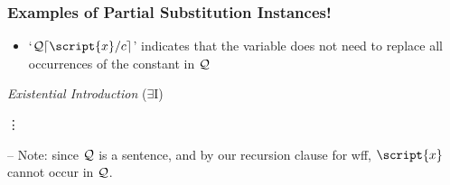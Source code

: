 \begin{frame}
\frametitle{Examples of Partial Substitution Instances!}

\begin{itemize}

\item `$\metav{Q}\substitutesome{c}{\script{x}}$' indicates that  the variable  does not need to replace all occurrences of the constant  in $\mathcal{Q}$

\end{itemize}

\begin{multicols}{2}

\begin{fitchproof}
	 
	 
	 
	 
\end{fitchproof}
\columnbreak

\begin{center}
\textit{Existential Introduction} ($\exists$I) \vspace{-0.5em}
\begin{fitchproof}
	 {\hspace{2em} \vdots}
 
\end{fitchproof}
    \end{center}
 -- Note: since $\mathcal{Q}$ is a sentence, and by our recursion clause for wff,  $\script{x}$ cannot occur in $\mathcal{Q}$. %
 \vspace{5em}

\end{multicols}
\end{frame}

